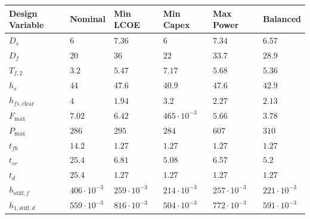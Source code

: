 \begin{tabular}{llllll}
Design Variable & Nominal & Min LCOE & Min Capex & Max Power & Balanced\\ 
\hline 
$D_s$ & $6 $ & $7.36 $ & $6 $ & $7.34 $ & $6.57 $ \\ 
$D_f$ & $20 $ & $36 $ & $22 $ & $33.7 $ & $28.9 $ \\ 
$T_{f,2}$ & $3.2 $ & $5.47 $ & $7.17 $ & $5.68 $ & $5.36 $ \\ 
$h_s$ & $44 $ & $47.6 $ & $40.9 $ & $47.6 $ & $42.9 $ \\ 
$h_{fs,\text{clear}}$ & $4 $ & $1.94 $ & $3.2 $ & $2.27 $ & $2.13 $ \\ 
$F_{\text{max}}$ & $7.02 $ & $6.42 $ & $465 \cdot 10^{-3}$ & $5.66 $ & $3.78 $ \\ 
$P_{\text{max}}$ & $286 $ & $295 $ & $284 $ & $607 $ & $310 $ \\ 
$t_{fb}$ & $14.2 $ & $1.27 $ & $1.27 $ & $1.27 $ & $1.27 $ \\ 
$t_{sr}$ & $25.4 $ & $6.81 $ & $5.08 $ & $6.57 $ & $5.2 $ \\ 
$t_d$ & $25.4 $ & $1.27 $ & $1.27 $ & $1.27 $ & $1.27 $ \\ 
$h_{\text{stiff},f}$ & $406 \cdot 10^{-3}$ & $259 \cdot 10^{-3}$ & $214 \cdot 10^{-3}$ & $257 \cdot 10^{-3}$ & $221 \cdot 10^{-3}$ \\ 
$h_{1,\text{stiff},d}$ & $559 \cdot 10^{-3}$ & $816 \cdot 10^{-3}$ & $504 \cdot 10^{-3}$ & $772 \cdot 10^{-3}$ & $591 \cdot 10^{-3}$ \\ 
\end{tabular}